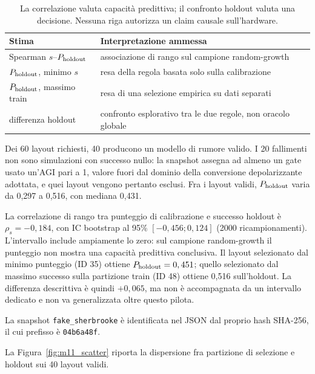 \begin{onehalfspace}
\begin{table}[H]
\centering
\small
\begin{tabular}{>{\raggedright\arraybackslash}p{}>{\raggedright\arraybackslash}p{}}
\toprule
\textbf{Stima} & \textbf{Interpretazione ammessa} \\
\midrule
Spearman $s$--$P_{\rm holdout}$ & associazione di rango sul campione random-growth \\
\addlinespace[0.3em]
$P_{\rm holdout}$, minimo $s$ & resa della regola basata solo sulla calibrazione \\
\addlinespace[0.3em]
$P_{\rm holdout}$, massimo train & resa di una selezione empirica su dati separati \\
\addlinespace[0.3em]
differenza holdout & confronto esplorativo tra le due regole, non oracolo globale \\
\bottomrule
\end{tabular}
\caption[Stimandi del pilota M11]{La correlazione valuta capacit\`a predittiva; il confronto holdout valuta una decisione. Nessuna riga autorizza un claim causale sull'hardware.}\label{tab:app_comp_predittori}

\end{table}

Dei 60 layout richiesti, 40 producono un modello di rumore valido. I 20
fallimenti non sono simulazioni con successo nullo: la snapshot assegna ad
almeno un gate usato un'AGI pari a 1, valore fuori dal dominio della
conversione depolarizzante adottata, e quei layout vengono pertanto esclusi.
Fra i layout validi, $P_{\rm holdout}$ varia da 0,297 a 0,516, con mediana
0,431.

La correlazione di rango tra punteggio di calibrazione e successo holdout è
$\rho_s=-0,184$, con IC bootstrap al 95\% $[-0,456;0,124]$ (2000
ricampionamenti). L'intervallo include ampiamente lo zero: sul campione
random-growth il punteggio non mostra una capacità predittiva conclusiva. Il
layout selezionato dal minimo punteggio (ID 35) ottiene
$P_{\rm holdout}=0,451$; quello selezionato dal massimo successo sulla
partizione train (ID 48) ottiene 0,516 sull'holdout. La differenza descrittiva
è quindi $+0,065$, ma non è accompagnata da un intervallo dedicato e non va
generalizzata oltre questo pilota.

La snapshot \texttt{fake\_sherbrooke} è identificata nel JSON dal proprio hash
SHA-256, il cui prefisso è \texttt{04b6a48f}.

La Figura~\ref{fig:m11_scatter} riporta la dispersione fra partizione di selezione e holdout sui 40 layout validi.


\end{onehalfspace}
